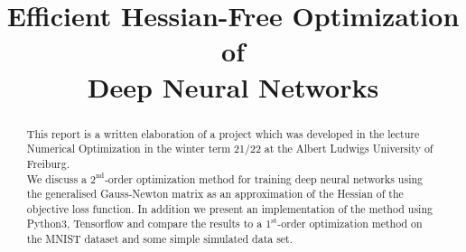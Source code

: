 \documentclass[conference]{IEEEtran}
\begin{document}
	\title{Efficient Hessian-Free Optimization of \\Deep Neural Networks}


	\author{
		\and
		\and
	}

	\maketitle
	\thispagestyle{plain}
	\pagestyle{plain}

	\begin{abstract}
		\noindent
		This report is a written elaboration of a project which was developed in the lecture Numerical Optimization in the winter term 21/22 at the Albert Ludwigs University of Freiburg.\\
		We discuss a $2^{\text{nd}}$-order optimization method for training deep neural networks using the generalised Gauss-Newton matrix as an approximation of the Hessian of the objective loss function. In addition we present an implementation of the method using Python3, Tensorflow and compare the results to a $1^{\text{st}}$-order optimization method on the MNIST dataset and some simple simulated data set.
	\end{abstract}
\end{document}
